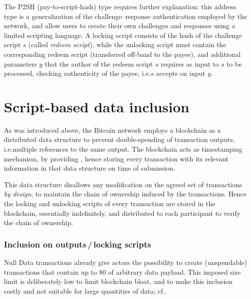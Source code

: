 \documentclass[a4paper,11pt,titlepage]{scrbook}
\begin{document}
The P2SH (pay-to-script-hash) type requires further explanation: this address type is a generalization of the challenge–response authentication employed by the network, and allow users to create their own challenges and responses using a limited scripting language.
A locking script consists of the hash of the challenge script $s$ (called \emph{redeem script}), while the unlocking script must contain the corresponding redeem script (transferred off-band to the payee), and additional parameters $y$ that the author of the redeem script $s$ requires as input to $s$ to be processed, checking authenticity of the payee, i.e.\@ $s$ accepts on input $y$.




\section{Script-based data inclusion}\label{sec:fakekeys}

As was introduced above, the Bitcoin network employs a blockchain as a distributed data structure to prevent double-spending of transaction outputs, i.e.\@ multiple references to the same output.
The blockchain acts as timestamping mechanism, by providing , hence storing every transaction with its relevant information in that data structure on time of submission.

This data structure disallows any modification on the agreed set of transactions \emph{by design}, 
to maintain the chain of ownership induced by the transactions.
Hence the locking and unlocking scripts of every transaction are stored in the blockchain, essentially indefinitely, and distributed to each participant to verify the chain of ownership.

\subsubsection*{Inclusion on outputs\,/\,locking scripts}

Null Data transactions already give actors the possibility to create (unspendable) transactions that contain up to \SI{80}{\byte} of arbitrary data payload. This imposed size limit is deliberately low to limit blockchain bloat, and to make this inclusion costly and not suitable for large quantities of data; cf.\@ \cite[155--156]{antonopoulos_mastering_2017}.
\end{document}
